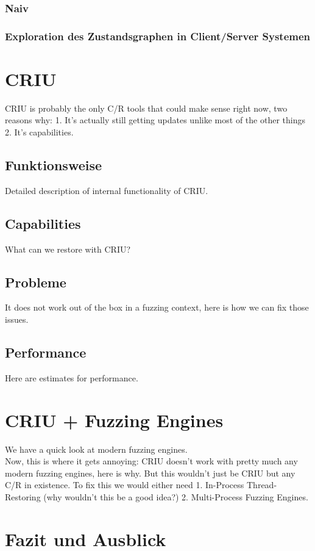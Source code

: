 \documentclass[12pt]{scrartcl}
\begin{document}
\subsubsection{Naiv}
\subsubsection{Exploration des Zustandsgraphen in Client/Server Systemen}

\section{CRIU}
CRIU is probably the only C/R tools that could make sense right now, two reasons why: 1. It's actually still getting updates unlike most of the other things 2. It's capabilities.
\subsection{Funktionsweise}
Detailed description of internal functionality of CRIU.
\subsection{Capabilities}
What can we restore with CRIU? 
\subsection{Probleme}
It does not work out of the box in a fuzzing context, here is how we can fix those issues. 
\subsection{Performance}
Here are estimates for performance.


\section{CRIU + Fuzzing Engines}
We have a quick look at modern fuzzing engines.\\
Now, this is where it gets annoying: CRIU doesn't work with pretty much any modern fuzzing engines, here is why. But this wouldn't just be CRIU but any C/R in existence. To fix this we would either need 1. In-Process Thread-Restoring (why wouldn't this be a good idea?) 2. Multi-Process Fuzzing Engines.

\section{Fazit und Ausblick}
\end{document}
